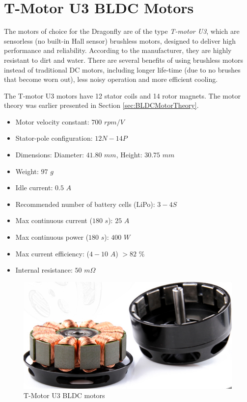 \documentclass[a4paper]{report}
\begin{document}
	\section{T-Motor U3 BLDC Motors}
The motors of choice for the Dragonfly are of the type \emph{T-motor U3}, which are sensorless (no built-in Hall sensor) brushless motors, designed to deliver high performance and reliability. According to the manufacturer, they are highly resistant to dirt and water. There are several benefits of using brushless motors instead of traditional DC motors, including longer life-time (due to no brushes that become worn out), less noisy operation and more efficient cooling.

The T-motor U3 motors have 12 stator coils and 14 rotor magnets. The motor theory was earlier presented in Section \ref{sec:BLDCMotorTheory}.

\begin{itemize}
  \item Motor velocity constant: $700$ $rpm/V$
  \item Stator-pole configuration: $12N-14P$
  \item Dimensions: Diameter: $41.80$ $mm$, Height: $30.75$ $mm$
  \item Weight: $97$ $g$
  \item Idle current: $0.5$ $A$
  \item Recommended number of battery cells (LiPo): $3-4S$
  \item Max continuous current ($180$ $s$): $25$ $A$
  \item Max continuous power ($180$ $s$): $400$ $W$
  \item Max current efficiency: ($4-10$ $A$) $>82$ \%
  \item Internal resistance: $50$ $m\Omega$
\end{itemize}

\begin{figure}[h]
    \centering
    \includegraphics[scale=0.6]{images/tmotoru3open.png}
    \caption{T-Motor U3 BLDC motors}
    \label{fig:tmotoru3open}
\end{figure}
\end{document}
